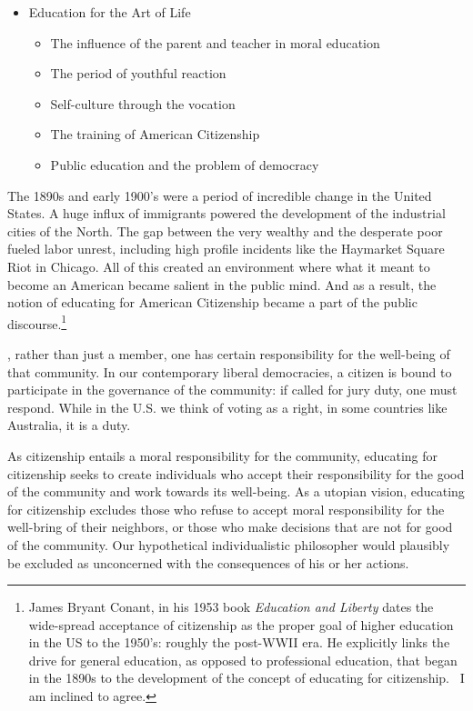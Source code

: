 \begin{itemize}
\item Education for the Art of Life

\begin{itemize}
\item The influence of the parent and teacher in moral education

\item The period of youthful reaction

\item Self-culture through the vocation

\item The training of American Citizenship

\item Public education and the problem of democracy ~\citep{Griggs:1900th}

\end{itemize}

\end{itemize}

The 1890s and early 1900's were a period of incredible change in the United States. A huge influx of immigrants powered the development of the industrial cities of the North. The gap between the very wealthy and the desperate poor fueled labor unrest, including high profile incidents like the Haymarket Square Riot in Chicago. All of this created an environment where what it meant to become an American became salient in the public mind. And as a result, the notion of educating for American Citizenship became a part of the public discourse.\footnote{James Bryant Conant, in his 1953 book \emph{Education and Liberty} dates the wide-spread acceptance of citizenship as the proper goal of higher education in the US to the 1950's: roughly the post-WWII era. He explicitly links the drive for general education, as opposed to professional education, that began in the 1890s to the development of the concept of educating for citizenship.~\citep[p. 47, e.g.]{Conant:1953ut} I am inclined to agree.}

, rather than just a member, one has certain responsibility for the well-being of that community. In our contemporary liberal democracies, a citizen is bound to participate in the governance of the community: if called for jury duty, one must respond. While in the U.S. we think of voting as a right, in some countries like Australia, it is a duty. 

As citizenship entails a moral responsibility for the community, educating for citizenship seeks to create individuals who accept their responsibility for the good of the community and work towards its well-being. As a utopian vision, educating for citizenship excludes those who refuse to accept moral responsibility for the well-bring of their neighbors, or those who make decisions that are not for good of the community. Our hypothetical individualistic philosopher would plausibly be excluded as unconcerned with the consequences of his or her actions.

